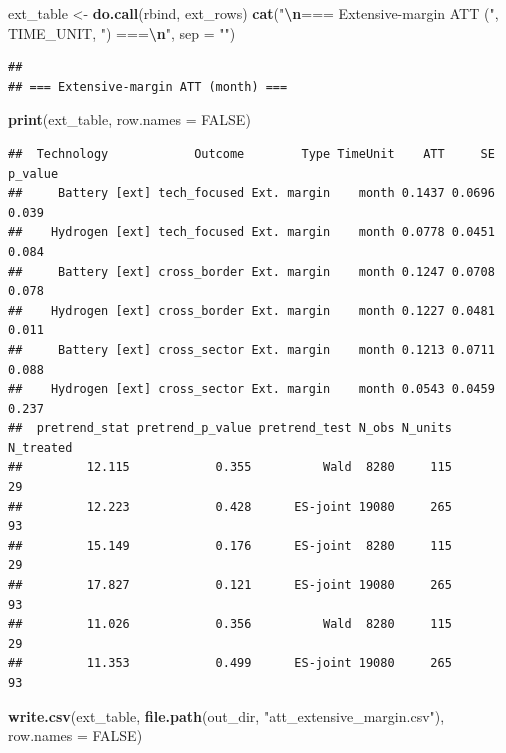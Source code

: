 \documentclass[
]{article}
\newenvironment{Shaded}{\begin{snugshade}}{\end{snugshade}}
\newcommand{\AttributeTok}[1]{\textcolor[rgb]{0.13,0.29,0.53}{#1}}
\newcommand{\ConstantTok}[1]{\textcolor[rgb]{0.56,0.35,0.01}{#1}}
\newcommand{\FunctionTok}[1]{\textcolor[rgb]{0.13,0.29,0.53}{\textbf{#1}}}
\newcommand{\NormalTok}[1]{#1}
\newcommand{\OtherTok}[1]{\textcolor[rgb]{0.56,0.35,0.01}{#1}}
\newcommand{\SpecialCharTok}[1]{\textcolor[rgb]{0.81,0.36,0.00}{\textbf{#1}}}
\newcommand{\StringTok}[1]{\textcolor[rgb]{0.31,0.60,0.02}{#1}}
\begin{document}
\begin{Shaded}
\begin{Highlighting}[]
\NormalTok{ext\_table }\OtherTok{\textless{}{-}} \FunctionTok{do.call}\NormalTok{(rbind, ext\_rows)}
\FunctionTok{cat}\NormalTok{(}\StringTok{"}\SpecialCharTok{\textbackslash{}n}\StringTok{=== Extensive{-}margin ATT ("}\NormalTok{, TIME\_UNIT, }\StringTok{") ===}\SpecialCharTok{\textbackslash{}n}\StringTok{"}\NormalTok{, }\AttributeTok{sep =} \StringTok{""}\NormalTok{)}
\end{Highlighting}
\end{Shaded}

\begin{verbatim}
## 
## === Extensive-margin ATT (month) ===
\end{verbatim}

\begin{Shaded}
\begin{Highlighting}[]
\FunctionTok{print}\NormalTok{(ext\_table, }\AttributeTok{row.names =} \ConstantTok{FALSE}\NormalTok{)}
\end{Highlighting}
\end{Shaded}

\begin{verbatim}
##  Technology            Outcome        Type TimeUnit    ATT     SE p_value
##     Battery [ext] tech_focused Ext. margin    month 0.1437 0.0696   0.039
##    Hydrogen [ext] tech_focused Ext. margin    month 0.0778 0.0451   0.084
##     Battery [ext] cross_border Ext. margin    month 0.1247 0.0708   0.078
##    Hydrogen [ext] cross_border Ext. margin    month 0.1227 0.0481   0.011
##     Battery [ext] cross_sector Ext. margin    month 0.1213 0.0711   0.088
##    Hydrogen [ext] cross_sector Ext. margin    month 0.0543 0.0459   0.237
##  pretrend_stat pretrend_p_value pretrend_test N_obs N_units N_treated
##         12.115            0.355          Wald  8280     115        29
##         12.223            0.428      ES-joint 19080     265        93
##         15.149            0.176      ES-joint  8280     115        29
##         17.827            0.121      ES-joint 19080     265        93
##         11.026            0.356          Wald  8280     115        29
##         11.353            0.499      ES-joint 19080     265        93
\end{verbatim}

\begin{Shaded}
\begin{Highlighting}[]
\FunctionTok{write.csv}\NormalTok{(ext\_table,}
          \FunctionTok{file.path}\NormalTok{(out\_dir, }\StringTok{"att\_extensive\_margin.csv"}\NormalTok{), }\AttributeTok{row.names =} \ConstantTok{FALSE}\NormalTok{)}
\end{Highlighting}
\end{Shaded}
\end{document}
